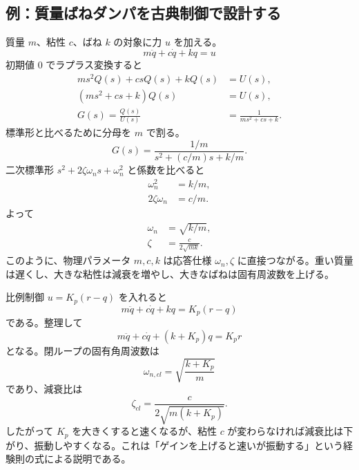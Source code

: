 \subsection{例：質量ばねダンパを古典制御で設計する}

質量 $m$、粘性 $c$、ばね $k$ の対象に力 $u$ を加える。
\begin{equation}
  m\ddot{q}+c\dot{q}+kq=u
\end{equation}
初期値 0 でラプラス変換すると
\begin{align}
  m s^2Q(s)+csQ(s)+kQ(s)&=U(s),\\
  (ms^2+cs+k)Q(s)&=U(s),\\
  G(s)=\frac{Q(s)}{U(s)}&=\frac{1}{ms^2+cs+k}.
\end{align}
標準形と比べるために分母を $m$ で割る。
\begin{equation}
  G(s)=\frac{1/m}{s^2+(c/m)s+k/m}.
\end{equation}
二次標準形 $s^2+2\zeta\omega_ns+\omega_n^2$ と係数を比べると
\begin{align}
  \omega_n^2&=k/m,\\
  2\zeta\omega_n&=c/m.
\end{align}
よって
\begin{align}
  \omega_n&=\sqrt{k/m},\\
  \zeta&=\frac{c}{2\sqrt{mk}}.
\end{align}
このように、物理パラメータ $m,c,k$ は応答仕様 $\omega_n,\zeta$ に直接つながる。重い質量は遅くし、大きな粘性は減衰を増やし、大きなばねは固有周波数を上げる。

比例制御 $u=K_p(r-q)$ を入れると
\begin{equation}
  m\ddot{q}+c\dot{q}+kq=K_p(r-q)
\end{equation}
である。整理して
\begin{equation}
  m\ddot{q}+c\dot{q}+(k+K_p)q=K_pr
\end{equation}
となる。閉ループの固有角周波数は
\begin{equation}
  \omega_{n,cl}=\sqrt{\frac{k+K_p}{m}}
\end{equation}
であり、減衰比は
\begin{equation}
  \zeta_{cl}=\frac{c}{2\sqrt{m(k+K_p)}}.
\end{equation}
したがって $K_p$ を大きくすると速くなるが、粘性 $c$ が変わらなければ減衰比は下がり、振動しやすくなる。これは「ゲインを上げると速いが振動する」という経験則の式による説明である。

